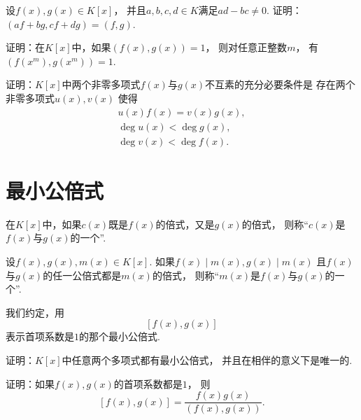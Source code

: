 \begin{example}
设\(f(x),g(x) \in K[x]\)，
并且\(a,b,c,d \in K\)满足\(ad-bc\neq0\).
证明：\((af+bg,cf+dg)=(f,g)\).
\end{example}

\begin{example}
证明：在\(K[x]\)中，如果\((f(x),g(x))=1\)，
则对任意正整数\(m\)，
有\((f(x^m),g(x^m))=1\).
\end{example}

\begin{example}
证明：\(K[x]\)中两个非零多项式\(f(x)\)与\(g(x)\)不互素的充分必要条件是
存在两个非零多项式\(u(x),v(x)\)
使得\begin{gather*}
	u(x) f(x) = v(x) g(x), \\
	\deg u(x) < \deg g(x), \\
	\deg v(x) < \deg f(x).
\end{gather*}
\end{example}

\section{最小公倍式}
在\(K[x]\)中，如果\(c(x)\)既是\(f(x)\)的倍式，又是\(g(x)\)的倍式，
则称“\(c(x)\)是\(f(x)\)与\(g(x)\)的一个”.

\begin{definition}
设\(f(x),g(x),m(x) \in K[x]\).
如果\(f(x) \mid m(x),
g(x) \mid m(x)\)
且\(f(x)\)与\(g(x)\)的任一公倍式都是\(m(x)\)的倍式，
则称“\(m(x)\)是\(f(x)\)与\(g(x)\)的一个”.
\end{definition}

我们约定，用\[
	[f(x), g(x)]
\]表示首项系数是\(1\)的那个最小公倍式.

\begin{example}
证明：\(K[x]\)中任意两个多项式都有最小公倍式，
并且在相伴的意义下是唯一的.
\end{example}

\begin{example}
证明：如果\(f(x),g(x)\)的首项系数都是\(1\)，
则\[
	[f(x),g(x)]
	= \frac{f(x) g(x)}{(f(x),g(x))}.
\]
\end{example}

